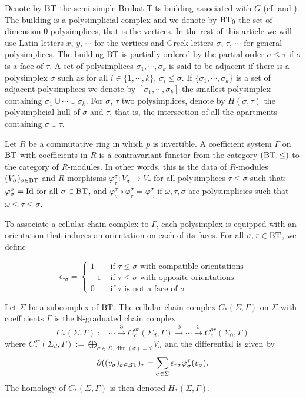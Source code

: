 \documentclass[a4paper,10pt]{amsart}
\begin{document}
\bigskip
Denote by $\bt$ the semi-simple Bruhat-Tits building associated with $G$ (cf. \cite{bt1} and \cite{BT}). The building is a polysimplicial complex and we denote by $\bts$ the set of dimension 0 polysimplices, that is the vertices. In the rest of this article we will use Latin letters $x$, $y$, $\cdots$ for the vertices and Greek letters $\sigma$, $\tau$, $\cdots$ for general polysimplices. The building $\bt$ is partially ordered by the partial order $\sigma \leq \tau$ if $\sigma$ is a face of $\tau$. A set of polysimplices $\sigma_{1},\cdots,\sigma_{k}$ is said to be adjacent if there is a polysimplex $\sigma$ such as for all $i \in \{1,\cdots,k\}$, $\sigma_{i} \leq \sigma$. If $\{\sigma_{1},\cdots,\sigma_{k}\}$ is a set of adjacent polysimplices we denote by $[\sigma_{1},\cdots,\sigma_{k}]$ the smallest polysimplex containing $\sigma_{1} \cup \cdots \cup \sigma_{k}$. For $\sigma$, $\tau$ two polysimplices, denote by $H(\sigma,\tau)$ the polysimplicial hull of $\sigma$ and $\tau$, that is, the intersection of all the apartments containing $\sigma \cup \tau$.


\bigskip


Let $R$ be a commutative ring in which $p$ is invertible. A coefficient system $\Gamma$ on $\bt$ with coefficients in $R$ is a contravariant functor from the category $(\bt,\leq)$ to the category of $R$-modules. In other words, this is the data of $R$-modules $(V_{\sigma})_{\sigma \in \bt}$ and $R$-morphisms $\varphi_{\tau}^{\sigma}:V_{\sigma} \rightarrow V_{\tau}$ for all polysimplices $\tau \leq \sigma$ such that: $\varphi_{\sigma}^{\sigma} = \operatorname{Id}$ for all $\sigma \in \bt$, and $\varphi_{\omega}^{\tau} \circ \varphi_{\tau}^{\sigma} = \varphi_{\omega}^{\sigma}$ if $\omega, \tau, \sigma$ are polysimplicies such that $\omega \leq \tau \leq \sigma$.


To associate a cellular chain complex to $\Gamma$, each polysimplex is equipped with an orientation that induces an orientation on each of its faces. For all $\sigma,\tau \in \bt$, we define

\[\epsilon_{\tau\sigma}=
\begin{cases}
1 &\text{ if } \tau \leq \sigma \text{ with compatible orientations} \\
-1 &\text{ if } \tau \leq \sigma \text{ with opposite orientations} \\
0 &\text{ if } \tau \text{ is not a face of } \sigma
\end{cases}
\]



Let $\Sigma$ be a subcomplex of $\bt$. The cellular chain complex $C_{*}(\Sigma,\Gamma)$ on $\Sigma$ with coefficients $\Gamma$ is the $\mathbb{N}$-graduated chain complex
\[C_{*}(\Sigma,\Gamma):=\cdots \overset{\partial}{\to} C_c^{or}(\Sigma_{d},\Gamma) \overset{\partial}{\to} \cdots \overset{\partial}{\to} C_c^{or}(\Sigma_{0},\Gamma)\]
where $C_c^{or}(\Sigma_{d},\Gamma):=\bigoplus_{\sigma \in \Sigma, \dim(\sigma)=d} V_\sigma$ and the differential is given by
\[ \partial((v_\sigma)_{\sigma \in \bt})_{\tau} = \sum_{\sigma \in \Sigma} \epsilon_{\tau\sigma}\varphi_{\sigma}^{\tau}(v_\sigma).\]
The homology of $C_{*}(\Sigma,\Gamma)$ is then denoted $H_{*}(\Sigma,\Gamma)$.
\end{document}
